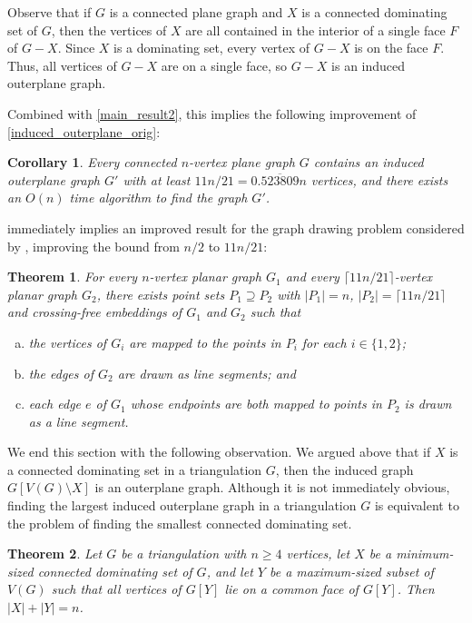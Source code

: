\documentclass[a4paper,UKenglish, cleveref, autoref, thm-restate]{lipics-v2021}
\newtheorem{thm}{Theorem}
\newtheorem{cor}{Corollary}
\begin{document}
Observe that if $G$ is a connected plane graph and $X$ is a connected dominating set of $G$, then the vertices of $X$ are all contained in the interior of a single face $F$ of $G-X$.  Since $X$ is a dominating set, every vertex of $G-X$ is on the face $F$.  Thus, all vertices of $G-X$ are on a single face, so $G-X$ is an induced outerplane graph.

Combined with \cref{main_result2}, this implies the following improvement of \cref{induced_outerplane_orig}:

\begin{cor}\label{induced_outerplane_improved}
    Every connected $n$-vertex plane graph $G$ contains an induced outerplane graph $G'$ with at least $11n/21=0.\overline{523809}n$ vertices, and there exists an $O(n)$ time algorithm to find the graph $G'$.
\end{cor}

 immediately implies an improved result for the graph drawing problem considered by \cite{angelini.evans.ea:sefe}, improving the bound from $n/2$ to $11n/21$:

\begin{thm}\label{sefenomap}
  For every $n$-vertex planar graph $G_1$ and every $\lceil 11n/21\rceil$-vertex planar graph $G_2$, there exists point sets $P_1\supseteq P_2$ with $|P_1|=n$, $|P_2|=\lceil 11n/21\rceil$ and crossing-free embeddings of $G_1$ and $G_2$ such that
  \begin{enumerate}[(a)]
    \item the vertices of $G_i$ are mapped to the points in $P_i$ for each $i\in\{1,2\}$;
    \item the edges of $G_2$ are drawn as line segments; and
    \item each edge $e$ of $G_1$ whose endpoints are both mapped to points in $P_2$ is drawn as a line segment.
  \end{enumerate}
\end{thm}

We end this section with the following observation. We argued above that if $X$ is a connected dominating set in a triangulation $G$, then the induced graph $G[V(G)\setminus X]$ is an outerplane graph.  Although it is not immediately obvious, finding the largest induced outerplane graph in a triangulation $G$ is equivalent to the problem of finding the smallest connected dominating set.

\begin{thm}
  Let $G$ be a triangulation with $n\ge 4$ vertices, let $X$ be a minimum-sized connected dominating set of $G$, and let $Y$ be a maximum-sized subset of $V(G)$ such that all vertices of $G[Y]$ lie on a common face of $G[Y]$. Then $|X|+|Y|=n$.
\end{thm}
\end{document}
